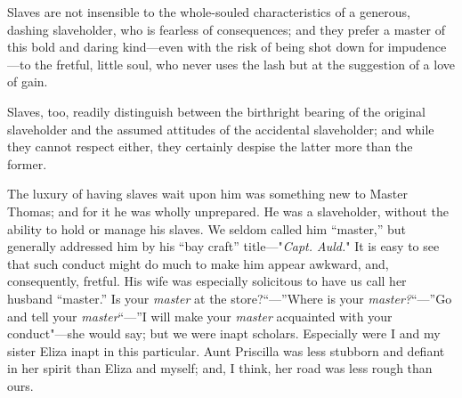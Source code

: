 Slaves are not insensible to the whole-souled characteristics of a
generous, dashing slaveholder, who is fearless of consequences; and they
prefer a master of this bold and daring kind---even with the risk of
being shot down for impudence---to the fretful, little soul, who never
uses the lash but at the suggestion of a love of gain.

Slaves, too, readily distinguish between the birthright bearing of the
original slaveholder and the assumed attitudes of the accidental
slaveholder; and while they cannot respect either, they certainly
despise the latter more than the former.

The luxury of having slaves wait upon him was something new to Master
Thomas; and for it he was wholly unprepared. He was a slaveholder,
without the ability to hold or manage his slaves. We seldom called him
``master,'' but generally addressed him by his ``bay craft''
title---"\emph{Capt. Auld.}" It is easy to see that such conduct might
do much to make him appear awkward, and, consequently, fretful. His wife
was especially solicitous to have us call her husband ``master.'' Is
your \emph{master} at the store?``---''Where is your
\emph{master?}``---''Go and tell your \emph{master}``---''I will make
your \emph{master} acquainted with your conduct"---she would say; but we
were inapt scholars. Especially were I and my sister Eliza inapt in this
particular. Aunt Priscilla was less {}stubborn and defiant in her spirit
than Eliza and myself; and, I think, her road was less rough than ours.

